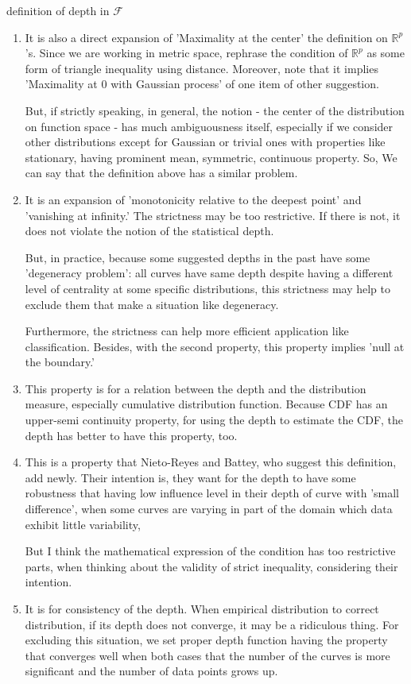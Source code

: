 \documentclass[aspectratio=169,ignorenonframetext,9pt]{beamer}
\theoremstyle{plain}
\theoremstyle{definition}
\begin{document}
\begin{frame}{definition of depth in $\mathcal{F}$}
\begin{enumerate}
    \item It is also a direct expansion of 'Maximality at the center' the definition on $\mathbb{R}^p$'s.
    Since we are working in metric space, rephrase the condition of $\mathbb{R}^p$ as
    some form of triangle inequality using distance.
    Moreover, note that it implies 'Maximality at 0 with Gaussian process' of one item of other suggestion.

    But, if strictly speaking, in general, the notion - the center of the distribution on function space - has much ambiguousness itself,
    especially if we consider other distributions except for Gaussian or trivial ones with properties 
    like stationary, having prominent mean, symmetric, continuous property.
    So, We can say that the definition above has a similar problem.

    \item It is an expansion of 'monotonicity relative to the deepest point' and 'vanishing at infinity.'
    The strictness may be too restrictive. If there is not, it does not violate the notion of the statistical depth.
    
    But, in practice, because some suggested depths in the past have some 'degeneracy problem': all curves have
    same depth despite having a different level of centrality at some specific distributions,
    this strictness may help to exclude them that make a situation like degeneracy.

    Furthermore, the strictness can help more efficient application like classification. 
    Besides, with the second property, this property implies 'null at the boundary.'

    \item This property is for a relation between the depth and the distribution measure, especially cumulative distribution function. 
    Because CDF has an upper-semi continuity property,
    for using the depth to estimate the CDF, the depth has better to have this property, too.

    \item This is a property that Nieto-Reyes and Battey, who suggest this definition, add newly. 
    Their intention is, they want for the depth to have some robustness 
    that having low influence level in their depth of curve with 'small difference',
    when some curves are varying in part of the domain which data exhibit little variability, 
    
    But I think the mathematical expression of the condition has too restrictive parts,
    when thinking about the validity of strict inequality, considering their intention.

    
    \item It is for consistency of the depth. When empirical distribution to correct distribution,
    if its depth does not converge, it may be a ridiculous thing. 
    For excluding this situation, we set proper depth function having the property 
    that converges well when both cases that the number of the curves is more significant 
    and the number of data points grows up.
\end{enumerate}
\end{frame}
\end{document}

